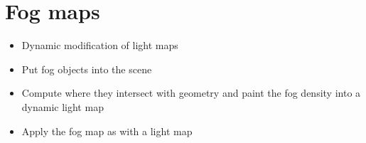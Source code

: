 \documentclass{article}[18pt]
\begin{document}
\section{Fog maps}
\begin{itemize}
	\item Dynamic modification of light maps
	\item Put fog objects into the scene
	\item Compute where they intersect with geometry and paint the fog density into a dynamic light map
	\item Apply the fog map as with a light map
\end{itemize}
\end{document}

